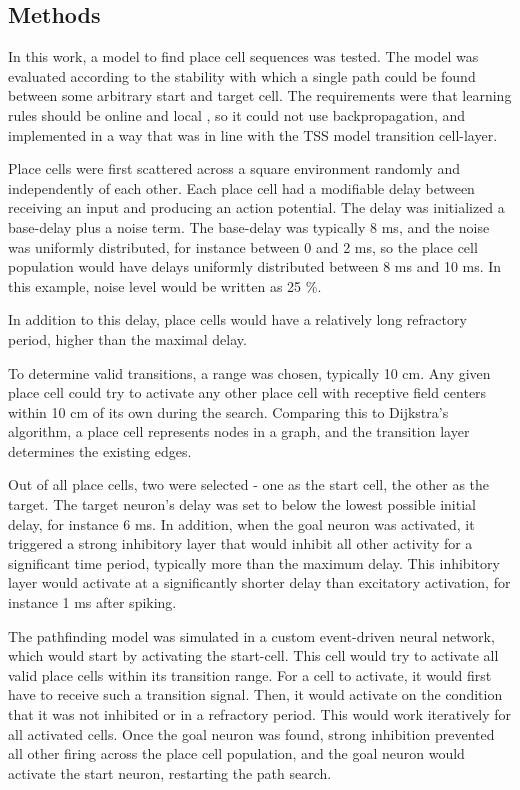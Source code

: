 \documentclass{article}
\begin{document}
    \subsection{Methods}
    In this work, a model to find place cell sequences was tested. The model was evaluated according to the stability with which a single path could be found between some arbitrary start and target cell. The requirements were that learning rules should be online and local \parencite{VanDerVeen2022}, so it could not use backpropagation, and implemented in a way that was in line with the TSS model transition cell-layer.

    Place cells were first scattered across a square environment randomly and independently of each other. Each place cell had a modifiable delay between receiving an input and producing an action potential. The delay was initialized a base-delay plus a noise term. The base-delay was typically 8 ms, and the noise was uniformly distributed, for instance between 0 and 2 ms, so the place cell population would have delays uniformly distributed between 8 ms and 10 ms. In this example, noise level would be written as 25 \%.

    In addition to this delay, place cells would have a relatively long refractory period, higher than the maximal delay.

    To determine valid transitions, a range was chosen, typically 10 cm. Any given place cell could try to 
    activate any other place cell with receptive field centers within 10 cm of its own during the search. Comparing this to Dijkstra's algorithm, a place cell represents nodes in a graph, and the transition layer determines the existing edges.

    Out of all place cells, two were selected - one as the start cell, the other as the target. The target neuron's delay was set to below the lowest possible initial delay, for instance 6 ms. In addition, when the goal neuron was activated, it triggered a strong inhibitory layer that would inhibit all other activity for a significant time period, typically more than the maximum delay. This inhibitory layer would activate at a significantly shorter delay than excitatory activation, for instance 1 ms after spiking.

    The pathfinding model was simulated in a custom event-driven neural network, which would start by activating the start-cell. This cell would try to activate all valid place cells within its transition range. For a cell to activate, it would first have to receive such a transition signal. Then, it would activate on the condition that it was not inhibited or in a refractory period.
    This would work iteratively for all activated cells. Once the goal neuron was found, strong inhibition prevented all other firing across the place cell population, and the goal neuron would activate the start neuron, restarting the path search.
\end{document}
